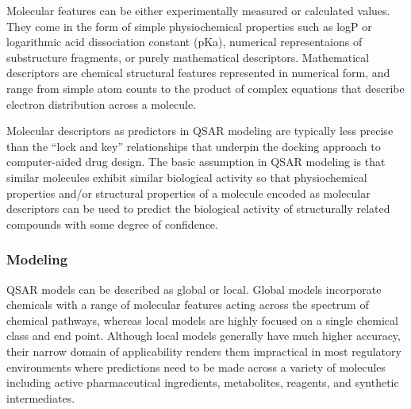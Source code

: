 
Molecular features can be either experimentally measured or calculated values. They come in the form of simple physiochemical properties such as logP or logarithmic acid dissociation constant (pKa), numerical representaions of substructure fragments, or purely mathematical descriptors. Mathematical descriptors are chemical structural features represented in numerical form, and range from simple atom counts to the product of complex equations that describe electron distribution across a molecule. \cite{Kruhlak2012}

Molecular descriptors as predictors in QSAR modeling are typically less precise than the “lock and key” relationships that underpin the docking approach to computer-aided drug design. The basic assumption in QSAR modeling is that similar molecules exhibit similar biological activity so that physiochemical properties and/or structural properties of a molecule encoded as molecular descriptors can be used to predict the biological activity of structurally related compounds with some degree of confidence.

\subsubsection{Modeling}
QSAR models can be described as global or local. Global models incorporate chemicals with a range of molecular features acting across the spectrum of chemical pathways, whereas local models are highly focused on a single chemical class and end point. Although local models generally have much higher accuracy, their narrow domain of applicability renders them impractical in most regulatory environments where predictions need to be made across a variety of molecules including active pharmaceutical ingredients, metabolites, reagents, and synthetic intermediates. \cite{Kruhlak2012}

